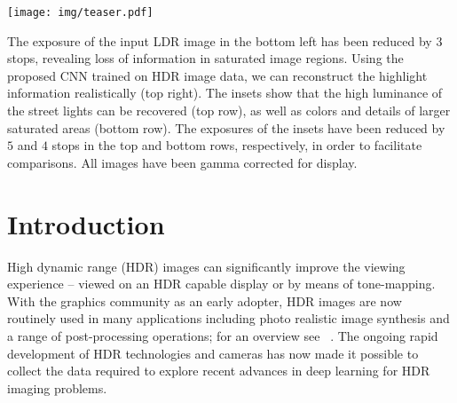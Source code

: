 \documentclass[acmtog]{acmart}
\begin{document}


\begin{teaserfigure}
	\centering
    \texttt{[image: img/teaser.pdf]}
    \caption{The exposure of the input LDR image in the bottom left has been reduced by $3$ stops, revealing loss of information in saturated image regions. Using the proposed CNN trained on HDR image data, we can reconstruct the highlight information realistically (top right). The insets show that the high luminance of the street lights can be recovered (top row), as well as colors and details of larger saturated areas (bottom row). The exposures of the insets have been reduced by $5$ and $4$ stops in the top and bottom rows, respectively, in order to facilitate comparisons. All images have been gamma corrected for display.}
    \label{fig:teaser}
\end{teaserfigure}

\maketitle



\section{Introduction}

High dynamic range (HDR) images can significantly improve the viewing experience -- viewed on an HDR capable display or by means of tone-mapping. With the graphics community as an early adopter, HDR images are now routinely used in many applications including photo realistic image synthesis and a range of post-processing operations; for an overview see ~\cite{Reinhard2010,Banterle2011,Dufaux2016}. The ongoing rapid development of HDR technologies and cameras has now made it possible to collect the data required to explore recent advances in deep learning for HDR imaging problems.
\end{document}
